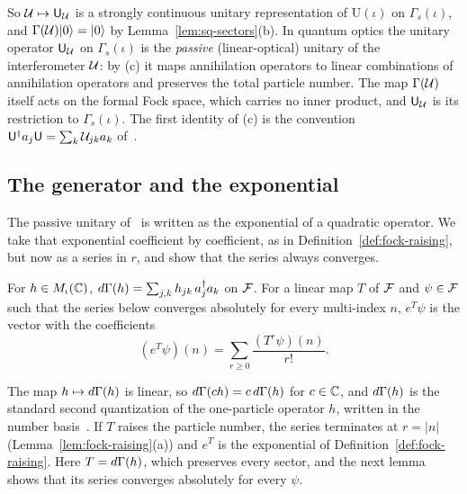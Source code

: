 \begin{vetdenv}
So $\mathcal U\mapsto\mathsf U_\mathcal U$ is a strongly continuous unitary representation of $\mathrm U(\iota)$ on $\Gamma_s(\iota)$, and
$\Gamma(\mathcal U)\lvert 0\rangle=\lvert 0\rangle$ by Lemma~\ref{lem:sq-sectors}(b). In quantum optics the unitary operator $\mathsf U_\mathcal U$ on
$\Gamma_s(\iota)$ is the \emph{passive} (linear-optical) unitary of the interferometer $\mathcal U$: by (c) it maps
annihilation operators to linear combinations of annihilation operators and preserves the total particle number.
The map $\Gamma(\mathcal U)$ itself acts on the formal Fock space, which carries no inner product, and $\mathsf U_\mathcal U$ is its
restriction to $\Gamma_s(\iota)$. The first identity of (c) is the convention $\mathsf U^\dagger a_j\mathsf U=\sum_k\mathcal U_{jk}a_k$
of~\cite{tjoacirac}.

\subsection{The generator and the exponential}

The passive unitary of~\cite[(12)]{tjoacirac} is written as the exponential of a quadratic operator. We take that
exponential coefficient by coefficient, as in Definition~\ref{def:fock-raising}, but now as a series in $r$, and
show that the series always converges.

\begin{definition}\label{def:sq-dgamma}
For $h\in M_\iota(\mathbb C)$, $d\Gamma(h)=\sum_{j,k}h_{jk}\,a_j^\dagger a_k$ on $\mathcal F$. For a linear map $T$ of $\mathcal F$ and
$\psi\in\mathcal F$ such that the series below converges absolutely for every multi-index $n$, $e^T\psi$ is the vector
with the coefficients
\[
 (e^T\psi)(n)=\sum_{r\ge0}\frac{(T^r\psi)(n)}{r!}.
\]
\end{definition}

The map $h\mapsto d\Gamma(h)$ is linear, so $d\Gamma(ch)=c\,d\Gamma(h)$ for $c\in\mathbb C$, and $d\Gamma(h)$ is the standard second
quantization of the one-particle operator $h$, written in the number basis~\cite{dg}. If $T$
raises the particle number, the series terminates at $r=\lvert n\rvert$ (Lemma~\ref{lem:fock-raising}(a)) and
$e^T$ is the exponential of Definition~\ref{def:fock-raising}. Here $T=d\Gamma(h)$, which preserves every sector, and
the next lemma shows that its series converges absolutely for every $\psi$.


\end{vetdenv}
